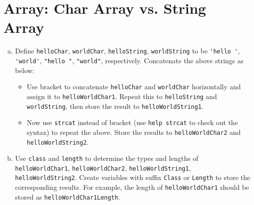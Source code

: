 \section{Array: Char Array vs. String Array}
\begin{enumerate}[(a)]
  \item Define \verb|helloChar|, \verb|worldChar|, \verb|helloString|, \verb|worldString| to be \verb|'hello '|, \verb|'world'|, \verb|"hello "|, \verb|"world"|, respectively. Concatenate the above strings as below:
    \begin{itemize}
      \item Use bracket to concatenate \verb|helloChar| and \verb|worldChar| horizontally and assign it to \verb|helloWorldChar1|. Repeat this to \verb|helloString| and \verb|worldString|, then store the result to \verb|helloWorldString1|.
      \item Now use \verb|strcat| instead of bracket (use \verb|help strcat| to check out the syntax) to repeat the above. Store the results to \verb|helloWorldChar2| and \verb|helloWorldString2|.
    \end{itemize}
\item Use \verb|class| and \verb|length| to determine the types and lengths of \verb|helloWorldChar1|, \verb|helloWorldChar2|, \verb|helloWorldString1|, \verb|helloWorldString2|. Create variables with suffix \verb|Class| or \verb|Length| to store the corresponding results. For example, the length of \verb|helloWorldChar1| should be stored as \verb|helloWorldChar1Length|.
\end{enumerate}

